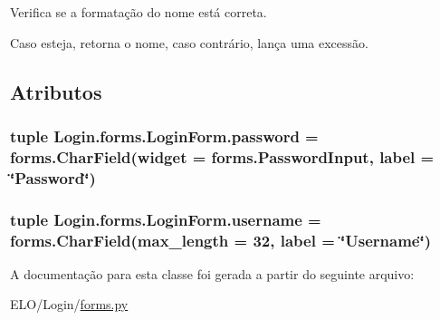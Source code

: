 Verifica se a formatação do nome está correta. 

Caso esteja, retorna o nome, caso contrário, lança uma excessão. 

\subsection{Atributos}
\hypertarget{classLogin_1_1forms_1_1LoginForm_a23e321f790e9c7bfc3e9abf767826a2d}{
\subsubsection[{password}]{\setlength{\rightskip}{0pt plus 5cm}tuple Login.\-forms.\-Login\-Form.\-password = forms.\-Char\-Field(widget = forms.\-Password\-Input, label = \char`\"{}Password\char`\"{})\hspace{0.3cm}{\ttfamily [static]}}}\label{classLogin_1_1forms_1_1LoginForm_a23e321f790e9c7bfc3e9abf767826a2d}
\hypertarget{classLogin_1_1forms_1_1LoginForm_af3766bb4ea8cabdf57ad77214b7545fd}{
\subsubsection[{username}]{\setlength{\rightskip}{0pt plus 5cm}tuple Login.\-forms.\-Login\-Form.\-username = forms.\-Char\-Field(max\-\_\-length = 32, label = \char`\"{}Username\char`\"{})\hspace{0.3cm}{\ttfamily [static]}}}\label{classLogin_1_1forms_1_1LoginForm_af3766bb4ea8cabdf57ad77214b7545fd}


A documentação para esta classe foi gerada a partir do seguinte arquivo\-:\begin{DoxyCompactItemize}
\item 
E\-L\-O/\-Login/\hyperlink{Login_2forms_8py}{forms.\-py}\end{DoxyCompactItemize}
